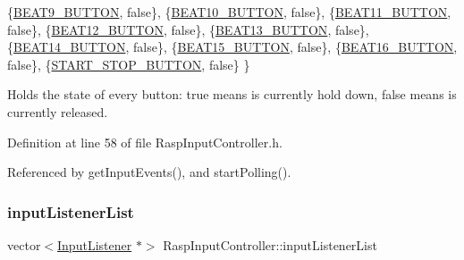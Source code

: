 \begin{DoxyCode}
            \{\hyperlink{namespaceinputs_af628ea84bf7114a62249d4bb425ed06a}{BEAT9\_BUTTON},           \textcolor{keyword}{false}\},
            \{\hyperlink{namespaceinputs_a9778bcf3a44a9d16ae156bac6d745a24}{BEAT10\_BUTTON},          \textcolor{keyword}{false}\},
            \{\hyperlink{namespaceinputs_ad09e4010a8b08721988599b198645372}{BEAT11\_BUTTON},          \textcolor{keyword}{false}\},
            \{\hyperlink{namespaceinputs_a7b6bb44b9241cac31ff9909c3fc88271}{BEAT12\_BUTTON},          \textcolor{keyword}{false}\},
            \{\hyperlink{namespaceinputs_a8f9d547eaa8c52cebfa64221341f266a}{BEAT13\_BUTTON},          \textcolor{keyword}{false}\},
            \{\hyperlink{namespaceinputs_a4dfd34a5656f72c71f1b2dd8efc963dc}{BEAT14\_BUTTON},          \textcolor{keyword}{false}\},
            \{\hyperlink{namespaceinputs_a1952aa2d27b65c8d8899a1ae1cfb7bb9}{BEAT15\_BUTTON},          \textcolor{keyword}{false}\},
            \{\hyperlink{namespaceinputs_af0f3099a06352ba4eb0808091b908178}{BEAT16\_BUTTON},          \textcolor{keyword}{false}\},
            \{\hyperlink{namespaceinputs_ab1d04ae8b7a7f4d11849c110f20fae10}{START\_STOP\_BUTTON},      \textcolor{keyword}{false}\}
    \}
\end{DoxyCode}


Holds the state of every button\+: true means is currently hold down, false means is currently released. 



Definition at line 58 of file Rasp\+Input\+Controller.\+h.



Referenced by get\+Input\+Events(), and start\+Polling().

\mbox{\label{class_rasp_input_controller_a5a5a8d99d69c35e206ddf7467e36cfae}} 
\subsubsection{\texorpdfstring{input\+Listener\+List}{inputListenerList}}
{\footnotesize\ttfamily vector$<$\hyperlink{class_input_listener}{Input\+Listener} $\ast$$>$ Rasp\+Input\+Controller\+::input\+Listener\+List\hspace{0.3cm}{\ttfamily [private]}}



